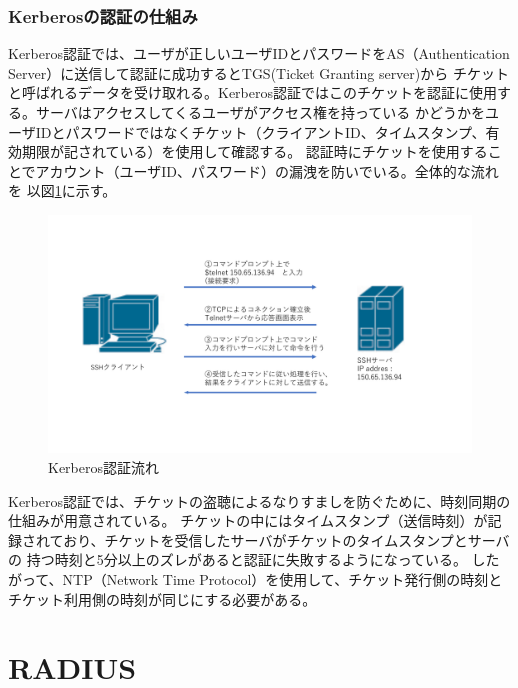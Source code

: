 \documentclass[11pt,a4j,titlepage]{jreport}
\begin{document}
\subsubsection*{Kerberosの認証の仕組み}
Kerberos認証では、ユーザが正しいユーザIDとパスワードをAS（Authentication Server）に送信して認証に成功するとTGS(Ticket Granting server)から
チケットと呼ばれるデータを受け取れる。Kerberos認証ではこのチケットを認証に使用する。サーバはアクセスしてくるユーザがアクセス権を持っている
かどうかをユーザIDとパスワードではなくチケット（クライアントID、タイムスタンプ、有効期限が記されている）を使用して確認する。
認証時にチケットを使用することでアカウント（ユーザID、パスワード）の漏洩を防いでいる。全体的な流れを
以図\ref{KerberosAuthority}に示す。
\begin{figure}[tbp]
    \begin{flushleft}
        \includegraphics[width=1.0\textwidth, page=12]{graphs/network_archtecture.pdf}
        \caption{Kerberos認証流れ}
        \label{KerberosAuthority}
    \end{flushleft}
\end{figure}\par
Kerberos認証では、チケットの盗聴によるなりすましを防ぐために、時刻同期の仕組みが用意されている。
チケットの中にはタイムスタンプ（送信時刻）が記録されており、チケットを受信したサーバがチケットのタイムスタンプとサーバの
持つ時刻と5分以上のズレがあると認証に失敗するようになっている。
したがって、NTP（Network Time Protocol）を使用して、チケット発行側の時刻とチケット利用側の時刻が同じにする必要がある。
\clearpage

\section{RADIUS}
\end{document}
